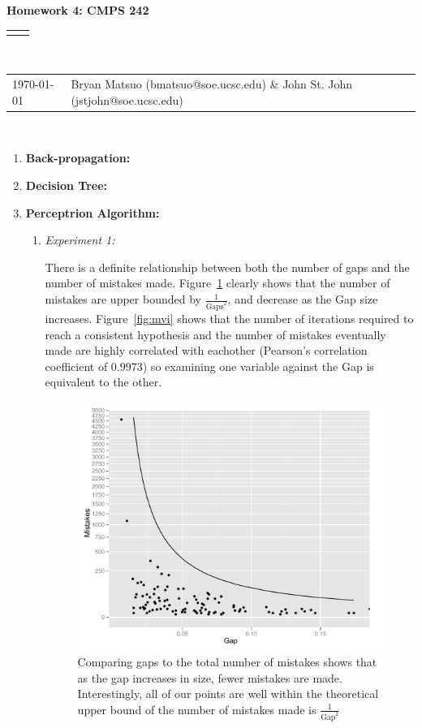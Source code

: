 \documentclass[12pt]{article}
\renewcommand{\title}[1]{\textbf{#1}\\}
\renewcommand{\line}{\begin{tabularx}{\textwidth}{X>{\raggedleft}X}\hline\\\end{tabularx}\\[-0.5cm]}
\newcommand{\leftright}[2]{\begin{tabularx}{\textwidth}{X>{\raggedleft}X}#1%
& #2\\\end{tabularx}\\[-0.5cm]}
\begin{document}
\title{Homework 4: CMPS 242}
\line
\leftright{\today}{Bryan Matsuo (bmatsuo@soe.ucsc.edu) \& John St. John (jstjohn@soe.ucsc.edu)} %
\begin{enumerate}
\item \textbf{Back-propagation:}

\item \textbf{Decision Tree:}

\item \textbf{Perceptrion Algorithm:}

\begin{enumerate}
\item \textit{Experiment 1:}

There is a definite relationship between both the number of gaps and the number of mistakes made. Figure~\ref{fig:gvm} clearly shows that the number of mistakes are upper bounded by $\frac{1}{\text{Gaps}^2}$, and decrease as the Gap size increases. Figure~\ref{fig:mvi} shows that the number of iterations required to reach a consistent hypothesis and the number of mistakes eventually made are highly correlated with eachother (Pearson's correlation coefficient of $0.9973$) so examining one variable against the Gap is equivalent to the other.


\begin{figure}[htbp]
\begin{center}
\includegraphics[scale=0.7]{ex1_gap_vs_Mistakes}
\caption{Comparing gaps to the total number of mistakes shows that as the gap increases in size, fewer mistakes are made. Interestingly, all of our points are well within the theoretical upper bound of the number of mistakes made is $\frac{1}{\text{Gap}^2}$}
\label{fig:gvm}
\end{center}


\end{figure}
\end{enumerate}
\end{enumerate}
\end{document}
